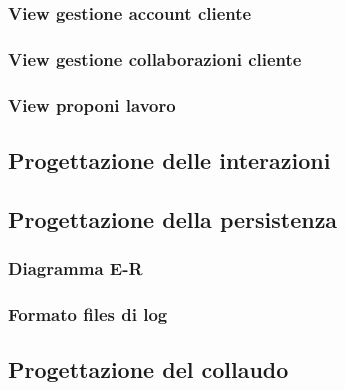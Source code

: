 \documentclass{article}
\begin{document}
\subsubsection{View gestione account cliente}

\subsubsection{View gestione collaborazioni cliente}

\subsubsection{View proponi lavoro}


\subsection{Progettazione delle interazioni}






\subsection{Progettazione della persistenza}
\subsubsection{Diagramma E-R}

\subsubsection{Formato files di log}


\subsection{Progettazione del collaudo}
\end{document}
